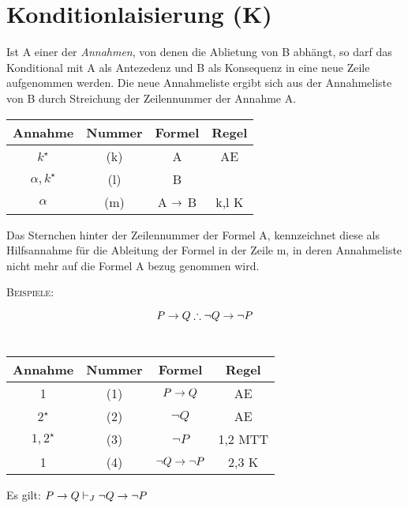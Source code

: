 \documentclass{sajzk}
\begin{document}
\section{Konditionlaisierung (K)}
\label{5qwp}
Ist A einer der \textit{Annahmen}, von denen die Ablietung von B abhängt, so
darf das Konditional mit A als Antezedenz und B als Konsequenz in eine neue
Zeile aufgenommen werden. Die neue Annahmeliste ergibt sich aus der Annahmeliste
von B durch Streichung der Zeilennummer der Annahme A.

\begin{center}
\begin{tabular}{|c|c|c|c|}
  \hline
  Annahme            & Nummer & Formel     & Regel \\
  \hline
  $k^\star$          & (k)    & A          & AE \\
  \hline
  $\alpha, k^\star$  & (l)    & B          &  \\
  \hline
  $\alpha$           & (m)    & A $\rightarrow$ B  & k,l K \\
  \hline
\end{tabular}
\end{center}
Das Sternchen hinter der Zeilennummer der Formel A, kennzeichnet diese als
Hilfsannahme für die Ableitung der Formel in der Zeile m, in deren Annahmeliste
nicht mehr auf die Formel A bezug genommen wird.

\textsc{Beispiele:}
\begin{center}
    \[P \rightarrow Q \therefore \lnot Q \rightarrow \lnot P\] \\

\begin{tabular}{|c|c|c|c|}
  \hline
  Annahme     & Nummer & Formel               & Regel \\
  \hline
  1           & (1)    & $P \rightarrow Q$            & AE \\
  \hline
  $2^\star$   & (2)    & $\lnot Q$            & AE \\
  \hline
  $1,2^\star$ & (3)    & $\lnot P$            & 1,2 MTT \\
  \hline
  1           & (4)   & $\lnot Q\rightarrow \lnot P$  & 2,3 K \\
  \hline
\end{tabular}
\end{center}
Es gilt: $P \rightarrow Q \vdash_J \lnot Q \rightarrow \lnot P$
\end{document}
